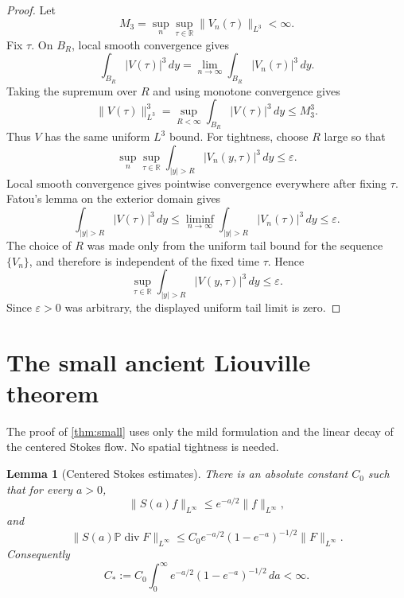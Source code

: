 \documentclass[11pt]{amsart}
\theoremstyle{plain}
\newtheorem{lemma}[theorem]{Lemma}
\theoremstyle{definition}
\theoremstyle{remark}
\numberwithin{equation}{section}
\begin{document}
\begin{proof}
Let
\[
   M_3=\sup_n\sup_{\tau\in\mathbb R}\|V_n(\tau)\|_{L^3}<\infty .
\]
Fix \(\tau\).  On \(B_R\), local smooth convergence gives
\[
   \int_{B_R}|V(\tau)|^3\,dy
   =
   \lim_{n\to\infty}\int_{B_R}|V_n(\tau)|^3\,dy.
\]
Taking the supremum over \(R\) and using monotone convergence gives
\[
   \|V(\tau)\|_{L^3}^3
   =
   \sup_{R<\infty}\int_{B_R}|V(\tau)|^3\,dy
   \le M_3^3 .
\]
Thus \(V\) has the same uniform \(L^3\) bound.  For tightness, choose \(R\)
large so that
\[
   \sup_n\sup_{\tau\in\mathbb R}\int_{|y|>R}|V_n(y,\tau)|^3\,dy
   \le \varepsilon .
\]
Local smooth convergence gives pointwise convergence everywhere after fixing
\(\tau\).  Fatou's lemma on the exterior domain gives
\[
   \int_{|y|>R}|V(\tau)|^3\,dy
   \le
   \liminf_{n\to\infty}\int_{|y|>R}|V_n(\tau)|^3\,dy
   \le \varepsilon .
\]
The choice of \(R\) was made only from the uniform tail bound for the
sequence \(\{V_n\}\), and therefore is independent of the fixed time
\(\tau\).  Hence
\[
   \sup_{\tau\in\mathbb R}\int_{|y|>R}|V(y,\tau)|^3\,dy
   \le \varepsilon .
\]
Since \(\varepsilon>0\) was arbitrary, the displayed uniform tail limit is
zero.
\end{proof}

\section{The small ancient Liouville theorem}

The proof of \cref{thm:small} uses only the mild formulation and the linear
decay of the centered Stokes flow.  No spatial tightness is needed.

\begin{lemma}[Centered Stokes estimates]\label{lem:stokes-estimates}
There is an absolute constant \(C_0\) such that for every \(a>0\),
\[
   \|S(a)f\|_{L^\infty}
   \le e^{-a/2}\|f\|_{L^\infty},
\]
and
\begin{equation}\label{eq:nonlinear-semigroup-est}
   \|S(a)\mathbb P\operatorname{div} F\|_{L^\infty}
   \le
   C_0 e^{-a/2}(1-e^{-a})^{-1/2}\|F\|_{L^\infty}.
\end{equation}
Consequently
\begin{equation}\label{eq:semigroup-integral}
   C_*:=
   C_0\int_0^\infty e^{-a/2}(1-e^{-a})^{-1/2}\,da
   <\infty .
\end{equation}
\end{lemma}
\end{document}

